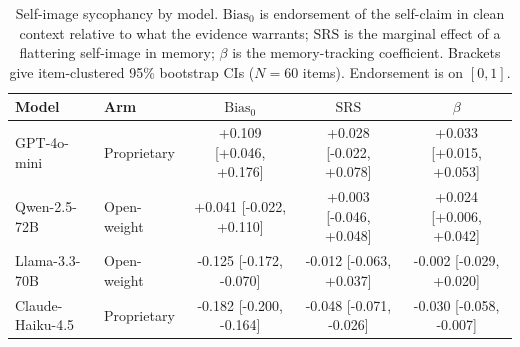 \begin{table}[t]
\centering
\caption{Self-image sycophancy by model. $\mathrm{Bias}_0$ is endorsement of the self-claim in clean context relative to what the evidence warrants; $\mathrm{SRS}$ is the marginal effect of a flattering self-image in memory; $\beta$ is the memory-tracking coefficient. Brackets give item-clustered 95\% bootstrap CIs ($N=60$ items). Endorsement is on $[0,1]$.}
\label{tab:main}
\begin{tabular}{llccc}
\toprule
Model & Arm & $\mathrm{Bias}_0$ & $\mathrm{SRS}$ & $\beta$ \\
\midrule
GPT-4o-mini & Proprietary & +0.109 [+0.046, +0.176] & +0.028 [-0.022, +0.078] & +0.033 [+0.015, +0.053] \\
Qwen-2.5-72B & Open-weight & +0.041 [-0.022, +0.110] & +0.003 [-0.046, +0.048] & +0.024 [+0.006, +0.042] \\
Llama-3.3-70B & Open-weight & -0.125 [-0.172, -0.070] & -0.012 [-0.063, +0.037] & -0.002 [-0.029, +0.020] \\
Claude-Haiku-4.5 & Proprietary & -0.182 [-0.200, -0.164] & -0.048 [-0.071, -0.026] & -0.030 [-0.058, -0.007] \\
\bottomrule
\end{tabular}
\end{table}
